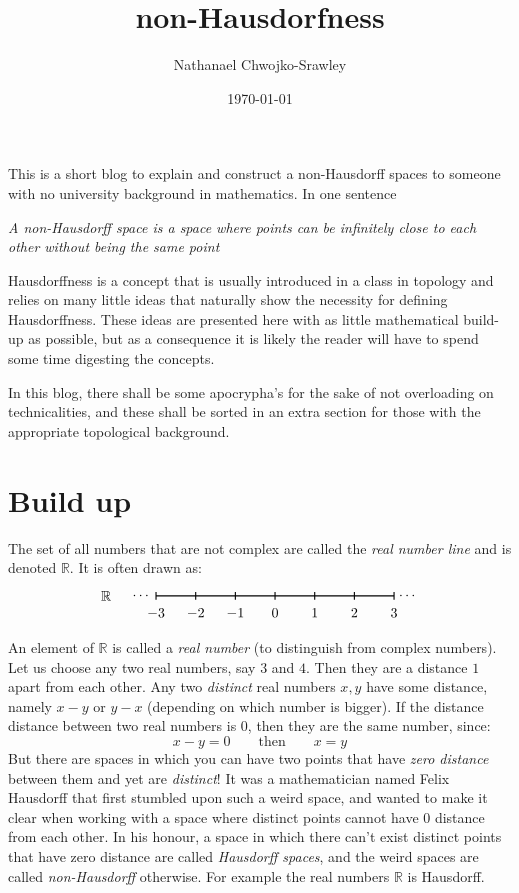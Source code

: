 \documentclass{article}
\title{non-Hausdorfness}
\author{Nathanael Chwojko-Srawley}
\date{\today}
\renewcommand{\maketitle}{
    \quad
    \vspace{1em}
  \begin{center}
      \LARGE\bfseries \thetitle \par
      \vspace{0.6em}
      \large
  \end{center}
    \vspace{1em}
}
\newcommand{\R}{{\mathbb{R}}}
\begin{document}
\maketitle

This is a short blog to explain and construct a non-Hausdorff spaces to someone with no university background
in mathematics. In one sentence
\begin{center}
  \emph{A non-Hausdorff space is a space where points can be infinitely close to each other without being the
  same point}
\end{center}
Hausdorffness is a concept that is usually introduced in a class in topology and relies on many little ideas that
naturally show the necessity for defining Hausdorffness. These ideas are presented here with as little mathematical
build-up as possible, but as a consequence it is likely the reader will have to spend some time digesting the
concepts.

In this blog, there shall be some apocrypha's for the sake of not overloading on technicalities, and these shall be
sorted in an extra section for those with the appropriate topological background.


\section{Build up}

The set of all numbers that are not complex are called the \emph{real number line} and is denoted $\R$. It is
often drawn as:
\[
\begin{tikzpicture}
  \draw[thick] (-3,1) -- (3,1) node[left=7cm] {$\R$};
  \foreach \x in {-3,-2,-1,0,1,2,3} {
    \draw[thick] (\x,0.9) -- (\x,1.1);
    \node[below] at (\x,0.8) {$\x$};
  }
  \node[left] at (-3,1) {$\cdots$};
  \node[right] at (3,1) {$\cdots$};
\end{tikzpicture}
\]
An element of $\R$ is called a \emph{real number} (to distinguish from complex
numbers). Let us choose any two real numbers, say $3$ and $4$. Then they are a distance $1$ apart from each
other. Any two \emph{distinct} real numbers $x,y$ have some distance, namely $x-y$ or $y-x$ (depending on
which number is bigger). If the distance distance between two real numbers is $0$, then they are the same
number, since:
\[
  x-y = 0 \qquad \text{then} \qquad x = y
\]
But there are spaces in which you can have two points that have \emph{zero distance} between them and yet are
\emph{distinct}! It was a mathematician named Felix Hausdorff that first stumbled upon such a weird space,
and wanted to make it clear when working with a space where distinct points cannot have 0 distance from each
other. In his honour, a space in which there can't exist distinct points that have zero distance are called
\emph{Hausdorff spaces}, and the weird spaces are called \emph{non-Hausdorff} otherwise. For example the real
numbers $\R$ is Hausdorff.
\end{document}
